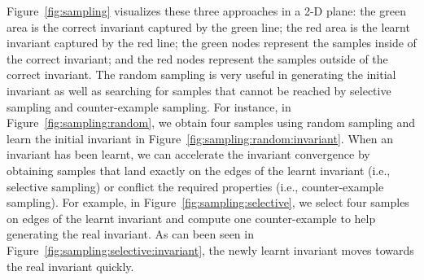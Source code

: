 Figure~\ref{fig:sampling} visualizes these three approaches in a 2-D plane: 
the green area is the correct invariant captured by the green line; 
the red area is the learnt invariant captured by the red line; 
the green nodes represent the samples inside of the correct invariant; 
and the red nodes represent the samples outside of the correct invariant. 
The random sampling is very useful in generating the initial invariant 
as well as searching for samples that cannot be reached 
by selective sampling and counter-example sampling. 
For instance, in Figure~\ref{fig:sampling:random}, 
we obtain four samples using random sampling 
and learn the initial invariant in Figure~\ref{fig:sampling:random:invariant}. 
When an invariant has been learnt, 
we can accelerate the invariant convergence by obtaining samples that 
land exactly on the edges of the learnt invariant (i.e., selective sampling) 
or conflict the required properties (i.e., counter-example sampling). 
For example, in Figure~\ref{fig:sampling:selective}, 
we select four samples on edges of the learnt invariant and 
compute one counter-example to help generating the real invariant. 
As can been seen in Figure~\ref{fig:sampling:selective:invariant}, 
the newly learnt invariant moves towards the real invariant quickly. 

